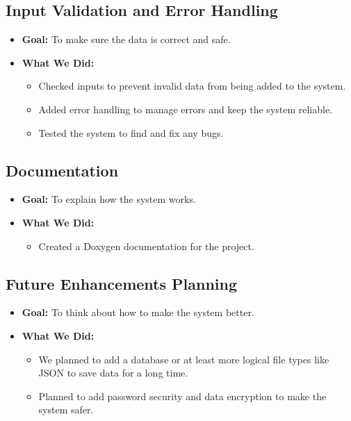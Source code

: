 \documentclass[12pt,a4paper]{report}
\begin{document}
\subsection{Input Validation and Error Handling}
\begin{itemize}
    \item \normalsize \textbf{Goal:} To make sure the data is correct and safe.
    \item \normalsize \textbf{What We Did:}
    \begin{itemize}
        \item Checked inputs to prevent invalid data from being added to the system.
        \item Added error handling to manage errors and keep the system reliable.
        \item Tested the system to find and fix any bugs.
    \end{itemize}
\end{itemize}

\subsection{Documentation}
\begin{itemize}
    \item \normalsize \textbf{Goal:} To explain how the system works.
    \item \normalsize \textbf{What We Did:}
    \begin{itemize}
        \item Created a Doxygen documentation for the project.
    \end{itemize}
\end{itemize}

\subsection{Future Enhancements Planning}
\begin{itemize}
    \item \normalsize \textbf{Goal:} To think about how to make the system better.
    \item \normalsize \textbf{What We Did:}
    \begin{itemize}
        \item We planned to add a database or at least more logical file types like JSON to save data for a long time.
        \item Planned to add password security and data encryption to make the system safer.
    \end{itemize}
\end{itemize}
\end{document}

